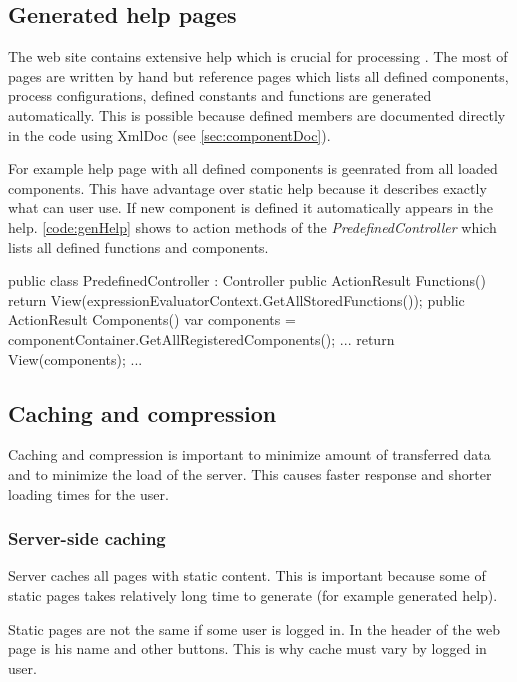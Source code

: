 \subsection{Generated help pages}

The web site contains extensive help which is crucial for processing \lsystems.
The most of pages are written by hand but reference pages which lists all defined components, process configurations, defined constants and functions are generated automatically.
This is possible because defined members are documented directly in the code using XmlDoc (see \autoref{sec:componentDoc}).

For example help page with all defined components is geenrated from all loaded components.
This have advantage over static help because it describes exactly what can user use.
If new component is defined it automatically appears in the help.
\autoref{code:genHelp} shows to action methods of the \emph{PredefinedController} which lists all defined functions and components.

\begin{Csharp}[label=code:genHelp,caption={Example of action methods of which lists all defined functions and components}]
public class PredefinedController : Controller {
	public ActionResult Functions() {
		return View(expressionEvaluatorContext.GetAllStoredFunctions());
	}
	public ActionResult Components() {
		var components = componentContainer.GetAllRegisteredComponents();
		...
		return View(components);
	}
	...
}
\end{Csharp}


\subsection{Caching and compression}

Caching and compression is important to minimize amount of transferred data and to minimize the load of the server.
This causes faster response and shorter loading times for the user.


\subsubsection{Server-side caching}

Server caches all pages with static content.
This is important because some of static pages takes relatively long time to generate (for example generated help).

Static pages are not the same if some user is logged in.
In the header of the web page is his name and other buttons.
This is why cache must vary by logged in user.


